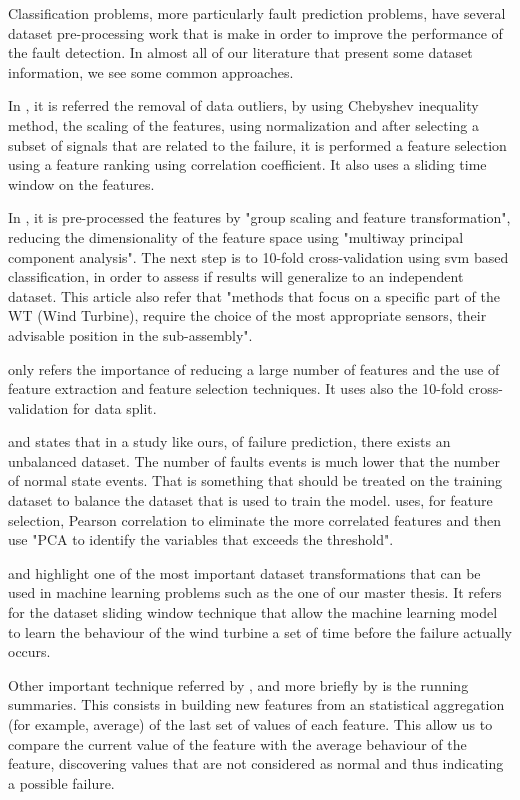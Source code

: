 Classification problems, more particularly fault prediction problems, have several dataset pre-processing work that is make in order to improve the performance of the fault detection. In almost all of our literature that present some dataset information, we see some common approaches.

In \cite{OLD_19_WIND}, it is referred the removal of data outliers, by using Chebyshev inequality method, the scaling of the features, using normalization and after selecting a subset of signals that are related to the failure, it is performed a feature selection using a feature ranking using correlation coefficient. It also uses a sliding time window on the features.

In \cite{N_2_WIND}, it is pre-processed the features by "group scaling and feature transformation", reducing the dimensionality of the feature space using "multiway principal component analysis". The next step is to 10-fold cross-validation using \acrshort{svm} based classification, in order to assess if results will generalize to an independent dataset. This article also refer that "methods that focus on a specific part of the WT (Wind Turbine), require the choice of the most appropriate sensors, their advisable position in the sub-assembly".

\cite{39_WIND} only refers the importance of reducing a large number of features and the use of feature extraction and feature selection techniques. It uses also the 10-fold cross-validation for data split.

\cite{N_3_WIND} and \cite{OLD_41_WIND} states that in a study like ours, of failure prediction, there exists an unbalanced dataset. The number of faults events is much lower that the number of normal state events. That is something that should be treated on the training dataset to balance the dataset that is used to train the model.
\cite{N_4_WIND} uses, for feature selection, Pearson correlation to eliminate the more correlated features and then use "PCA to identify the variables that exceeds the threshold".

\cite{TDC_1} and \cite{MED_1} highlight one of the most important dataset transformations that can be used in machine learning problems such as the one of our master thesis. It refers for the dataset sliding window technique that allow the machine learning model to learn the behaviour of the wind turbine a set of time before the failure actually occurs.

Other important technique referred by \cite{MED_1}, and more briefly by \cite{N_7_GENERAL} is the running summaries. This consists in building new features from an statistical aggregation (for example, average) of the last set of values of each feature. This allow us to compare the current value of the feature with the average behaviour of the feature, discovering values that are not considered as normal and thus indicating a possible failure.

